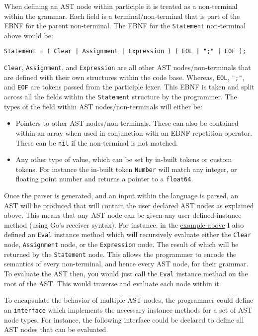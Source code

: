 When defining an AST node within participle it is treated as a non-terminal within the grammar. Each field is a terminal/non-terminal that is part of the EBNF for the parent non-terminal. The EBNF for the \verb|Statement| non-terminal above would be:

\begin{verbatim}
Statement = ( Clear | Assignment | Expression ) ( EOL | ";" | EOF );
\end{verbatim}

\verb|Clear|, \verb|Assignment|, and \verb|Expression| are all other AST nodes/non-terminals that are defined with their own structures within the code base. Whereas, \verb|EOL|, \verb|";"|, and \verb|EOF| are tokens passed from the participle lexer. This EBNF is taken and split across all the fields within the \verb|Statement| structure by the programmer. The types of the field within AST nodes/non-terminals will either be:

\begin{itemize}
    \item Pointers to other AST nodes/non-terminals. These can also be contained within an array when used in conjunction with an EBNF repetition operator. These can be \verb|nil| if the non-terminal is not matched.
    \item Any other type of value, which can be set by in-built tokens or custom tokens. For instance the in-built token \verb|Number| will match any integer, or floating point number and returns a pointer to a \verb|float64|.
\end{itemize}

Once the parser is generated, and an input within the language is parsed, an AST will be produced that will contain the user declared AST nodes as explained above. This means that any AST node can be given any user defined instance method (using Go's receiver syntax). For instance, in the \hyperref[fig:four-func-calc-statement-ast-node]{example above} I also defined an \verb|Eval| instance method which will recursively evaluate either the \verb|Clear| node, \verb|Assignment| node, or the \verb|Expression| node. The result of which will be returned by the \verb|Statement| node. This allows the programmer to encode the semantics of every non-terminal, and hence every AST node, for their grammar. To evaluate the AST then, you would just call the \verb|Eval| instance method on the root of the AST. This would traverse and evaluate each node within it.

To encapsulate the behavior of multiple AST nodes, the programmer could define an \verb|interface| which implements the necessary instance methods for a set of AST node types. For instance, the following interface could be declared to define all AST nodes that can be evaluated.

